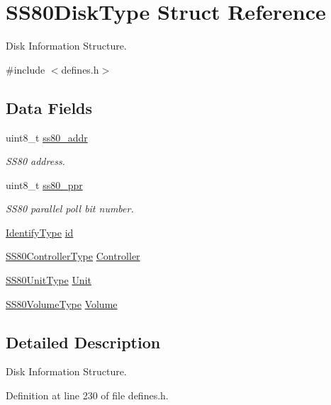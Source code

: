 \hypertarget{structSS80DiskType}{}\section{S\+S80\+Disk\+Type Struct Reference}
\label{structSS80DiskType}


Disk Information Structure.  




{\ttfamily \#include $<$defines.\+h$>$}

\subsection*{Data Fields}
\begin{DoxyCompactItemize}
\item 
uint8\+\_\+t \hyperlink{structSS80DiskType_af41bd36ae711bae5aaa86722798ea281}{ss80\+\_\+addr}
\begin{DoxyCompactList}\small\item\em S\+S80 address. \end{DoxyCompactList}\item 
uint8\+\_\+t \hyperlink{structSS80DiskType_a93cbe7ea84a0d2d33ecc4eaae8367bd5}{ss80\+\_\+ppr}
\begin{DoxyCompactList}\small\item\em S\+S80 parallel poll bit number. \end{DoxyCompactList}\item 
\hyperlink{structIdentifyType}{Identify\+Type} \hyperlink{structSS80DiskType_a051107cea479ec682a317e0c44ca5f51}{id}
\item 
\hyperlink{structSS80ControllerType}{S\+S80\+Controller\+Type} \hyperlink{structSS80DiskType_a2fe71dc8a453df2e8cde8e8dded1bb63}{Controller}
\item 
\hyperlink{structSS80UnitType}{S\+S80\+Unit\+Type} \hyperlink{structSS80DiskType_a53779c62a77383b446ab9097ed70481d}{Unit}
\item 
\hyperlink{structSS80VolumeType}{S\+S80\+Volume\+Type} \hyperlink{structSS80DiskType_a34eaa5702599d69fcd7c2fc7e13a2256}{Volume}
\end{DoxyCompactItemize}


\subsection{Detailed Description}
Disk Information Structure. 

Definition at line 230 of file defines.\+h.



